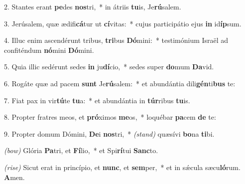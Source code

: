 2. Stantes erant \textbf{pe}des \textbf{nos}tri,~* in átriis \textbf{tu}is, Je\textbf{rú}salem.

3. Jerúsalem, quæ ædifi\textbf{cá}tur ut \textbf{cí}vitas:~* cujus participátio ejus \textbf{in} id\textbf{íp}sum.

4. Illuc enim ascendérunt tribus, \textbf{tri}bus \textbf{Dó}mini:~* testimónium Israël ad confiténdum \textbf{nó}mini \textbf{Dó}mini.

5. Quia illic sedérunt sedes \textbf{in} ju\textbf{dí}cio,~* sedes super \textbf{do}mum \textbf{Da}vid.

6. Rogáte quæ ad pacem \textbf{sunt} Je\textbf{rú}salem:~* et abundántia dili\textbf{gén}ti\textbf{bus} te:

7. Fiat pax in vir\textbf{tú}te \textbf{tu}a:~* et abundántia in \textbf{túr}ribus \textbf{tu}is.

8. Propter fratres meos, et \textbf{pró}ximos \textbf{me}os,~* loquébar \textbf{pa}cem \textbf{de} te:

9. Propter domum Dómini, \textbf{De}i \textbf{nos}tri,~* {\color{red}\textit{(stand)}} quæsívi \textbf{bo}na \textbf{ti}bi.

{\color{red}\textit{(bow)}} Glória \textbf{Pa}tri, et \textbf{Fí}lio,~* et Spi\textbf{rí}tui \textbf{Sanc}to.

{\color{red}\textit{(rise)}} Sicut erat in princípio, et \textbf{nunc}, et \textbf{sem}per,~* et in s\'{\ae}cula sæcu\textbf{ló}rum. \textbf{A}men.